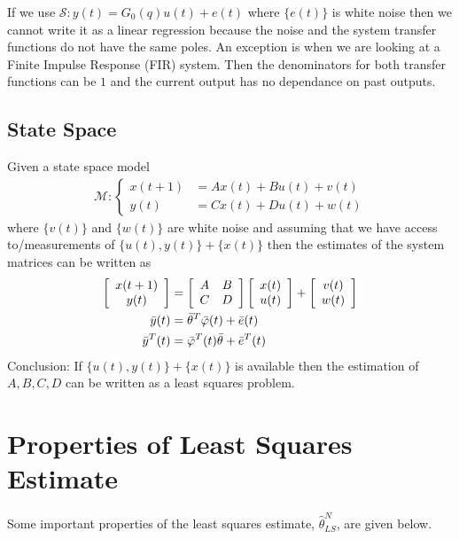 \documentclass[lecture,12pt,]{pcms-l}
\theoremstyle{example}
\newcommand{\thn}{\hat{\theta}_{LS}^N}
\begin{document}
If we use $\mathcal{S}: y(t) = G_0(q)u(t) + e(t)$ where $\{e(t)\}$ is white noise then we cannot write it as a linear regression because the noise and the system transfer functions do not have the same poles. An exception is when we are looking at a Finite Impulse Response (FIR) system. Then the denominators for both transfer functions can be $1$ and the current output has no dependance on past outputs.

\subsection{State Space}
Given a state space model
\begin{align*}
\mathcal{M}: \begin{cases} x(t+1)&=Ax(t)+Bu(t)+v(t) \\ y(t)&=Cx(t)+Du(t)+w(t) \end{cases}
\end{align*}
where $\{v(t)\}$ and $\{w(t)\}$ are white noise and assuming that we have access to/measurements of $\{u(t),y(t)\} + \{x(t)\}$ then the estimates of the system matrices can be written as
\begin{align}
\left[\begin{array}{c} x(t+1) \\ y(t) \end{array}\right] &=
\left[\begin{array}{c c} A & B \\ C & D \end{array}\right] \left[\begin{array}{c} x(t) \\ u(t) \end{array}\right] +
\left[\begin{array}{c} v(t) \\ w(t) \end{array}\right] \nonumber \\
\bar{y}(t) &= \bar{\theta}^T\bar{\varphi}(t) + \bar{e}(t) \nonumber \\
\bar{y}^T(t) &= \bar{\varphi}^T(t)\bar{\theta} + \bar{e}^T(t)
\end{align}
Conclusion: If $\{u(t),y(t)\} + \{x(t)\}$ is available then the estimation of $A,B,C,D$ can be written as a least squares problem.

\section{Properties of Least Squares Estimate}
Some important properties of the least squares estimate, $\thn$, are given below.
\end{document}
